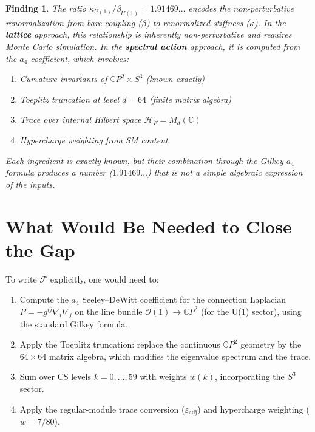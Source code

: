 \documentclass[11pt,a4paper]{article}
\newtheorem{finding}{Finding}
\theoremstyle{definition}
\begin{document}
\begin{finding}
The ratio $\kappa_{U(1)}/\beta_{U(1)} = 1.91469\ldots$ encodes the
non-perturbative renormalization from bare coupling ($\beta$) to
renormalized stiffness ($\kappa$).  In the \textbf{lattice} approach,
this relationship is inherently non-perturbative and requires Monte Carlo
simulation.  In the \textbf{spectral action} approach, it is computed from
the $a_4$ coefficient, which involves:
\begin{enumerate}
\item Curvature invariants of $\mathbb{C}P^2 \times S^3$ (known exactly)
\item Toeplitz truncation at level $d = 64$ (finite matrix algebra)
\item Trace over internal Hilbert space $\mathcal{H}_F = M_d(\mathbb{C})$
\item Hypercharge weighting from SM content
\end{enumerate}
Each ingredient is exactly known, but their combination through the Gilkey
$a_4$ formula produces a number ($1.91469\ldots$) that is not a simple
algebraic expression of the inputs.
\end{finding}

\section{What Would Be Needed to Close the Gap}

To write $\mathcal{F}$ explicitly, one would need to:

\begin{enumerate}
\item Compute the $a_4$ Seeley--DeWitt coefficient for the connection
Laplacian $P = -g^{ij}\nabla_i\nabla_j$ on the line bundle
$\mathcal{O}(1) \to \mathbb{C}P^2$ (for the U(1) sector), using the
standard Gilkey formula.

\item Apply the Toeplitz truncation: replace the continuous $\mathbb{C}P^2$
geometry by the $64 \times 64$ matrix algebra, which modifies the
eigenvalue spectrum and the trace.

\item Sum over CS levels $k = 0, \ldots, 59$ with weights $w(k)$,
incorporating the $S^3$ sector.

\item Apply the regular-module trace conversion ($\varepsilon_{\mathrm{adj}}$)
and hypercharge weighting ($w = 7/80$).
\end{enumerate}
\end{document}

